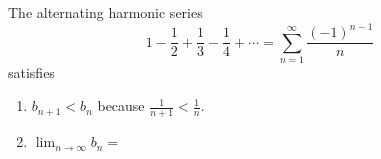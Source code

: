 \begin{frame}
\begin{example} %
The alternating harmonic series
\abovedisplayskip=0pt
\belowdisplayskip=0pt
\[
1 - \frac{1}{2} + \frac{1}{3} - \frac{1}{4} + \cdots = \sum_{n=1}^\infty \frac{(-1)^{n-1}}{n}
\]
satisfies
\begin{enumerate}
\item  $b_{n+1} < b_n$ because $\frac{1}{n+1} < \frac{1}{n}$.
\item  $\lim_{n\to\infty} b_n = $
\end{enumerate}
\end{example}
\end{frame}
